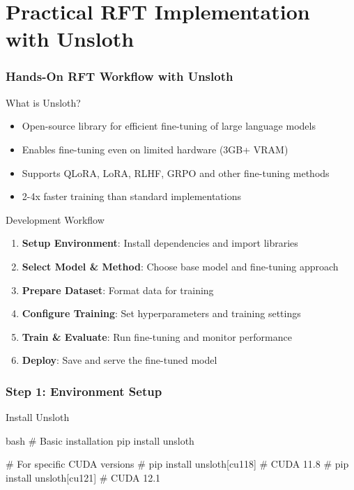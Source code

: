 \documentclass[aspectratio=169]{beamer}
\begin{document}
\section{Practical RFT Implementation with Unsloth}

\begin{frame}
	\frametitle{Hands-On RFT Workflow with Unsloth}
	\begin{block}{What is Unsloth?}
		\begin{itemize}
			\item Open-source library for efficient fine-tuning of large language models
			\item Enables fine-tuning even on limited hardware (3GB+ VRAM)
			\item Supports QLoRA, LoRA, RLHF, GRPO and other fine-tuning methods
			\item 2-4x faster training than standard implementations
		\end{itemize}
	\end{block}
	\begin{block}{Development Workflow}
		\begin{enumerate}
			\item \textbf{Setup Environment}: Install dependencies and import libraries
			\item \textbf{Select Model \& Method}: Choose base model and fine-tuning approach
			\item \textbf{Prepare Dataset}: Format data for training
			\item \textbf{Configure Training}: Set hyperparameters and training settings
			\item \textbf{Train \& Evaluate}: Run fine-tuning and monitor performance
			\item \textbf{Deploy}: Save and serve the fine-tuned model
		\end{enumerate}
	\end{block}
\end{frame}

\begin{frame}[fragile]
	\frametitle{Step 1: Environment Setup}
	\begin{block}{Install Unsloth}
		\begin{mintedbox}{bash}
# Basic installation
pip install unsloth

# For specific CUDA versions
# pip install unsloth[cu118]  # CUDA 11.8
# pip install unsloth[cu121]  # CUDA 12.1
		\end{mintedbox}
	\end{block}
\end{frame}
\end{document}
